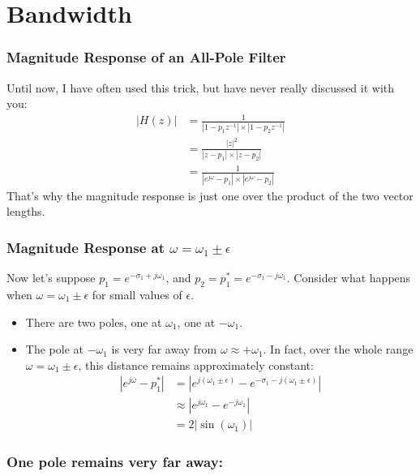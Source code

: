 \documentclass{beamer}
\begin{document}
\begin{frame}
  \centerline{}
\end{frame}
  

\section[Bandwidth]{Bandwidth}
\setcounter{subsection}{1}

\begin{frame}
  \frametitle{Magnitude Response of an All-Pole Filter}

  Until now, I have often used this trick, but have never really
  discussed it with you:
  \begin{align*}
    |H(z)| &= \frac{1}{|1-p_1z^{-1}|\times |1-p_2z^{-1}|}\\
    &= \frac{|z|^2}{|z-p_1|\times |z-p_2|} \\
    & =\frac{1}{|e^{j\omega}-p_1|\times |e^{j\omega}-p_2|}
  \end{align*}
  That's why the magnitude response is just one over the product of the two vector lengths.
\end{frame}

\begin{frame}
  \frametitle{Magnitude Response at $\omega=\omega_1\pm\epsilon$}

  Now let's suppose $p_1=e^{-\sigma_1+j\omega_1}$, and
  $p_2=p_1^*=e^{-\sigma_1-j\omega_1}$.  Consider what happens when
  $\omega=\omega_1\pm\epsilon$ for small values of $\epsilon$.
  \begin{itemize}
  \item There are two poles, one at $\omega_1$, one at $-\omega_1$.
  \item The pole at $-\omega_1$ is very far away from $\omega\approx +\omega_1$.
    In fact, over the whole range $\omega=\omega_1\pm\epsilon$, this distance
    remains approximately constant:
    \begin{align*}
      |e^{j\omega}-p_1^*|&= |e^{j(\omega_1\pm\epsilon)}-e^{-\sigma_1-j(\omega_1\pm\epsilon)}|\\
      &\approx |e^{j\omega_1}-e^{-j\omega_1}|\\
      &= 2|\sin(\omega_1)|
    \end{align*}
  \end{itemize}
\end{frame}  

\begin{frame}
  \frametitle{One pole remains very far away:}
  \centerline{}
\end{frame}
\end{document}
